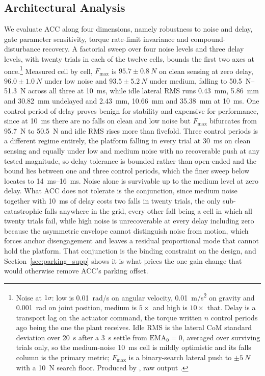 \documentclass[a4paper,fleqn]{cas-dc}
\begin{document}
\subsection{Architectural Analysis}
\label{sec:analysis}

We evaluate ACC along four dimensions, namely robustness to noise and delay, gate
parameter sensitivity, torque rate-limit invariance and compound-disturbance
recovery. A factorial sweep over four noise levels and three delay levels, with
twenty trials in each of the twelve cells, bounds the first two axes at
once.\footnote{Noise at $1\sigma$: low is \SI{0.01}{rad/s} on angular velocity,
\SI{0.01}{m/s^2} on gravity and \SI{0.001}{rad} on joint position, medium is
$5\times$ and high is $10\times$ that. Delay is a transport lag on the actuator
command, the torque written $n$ control periods ago being the one the plant
receives. Idle RMS is the lateral CoM standard deviation over \SI{20}{s} after a
\SI{3}{s} settle from $\mathrm{EMA}_0{=}0$, averaged over surviving trials only,
so the medium-noise \SI{10}{ms} cell is mildly optimistic and its falls column is
the primary metric; $F_{\max}$ is a binary-search lateral push to
$\pm\SI{5}{N}$ with a \SI{10}{N} search floor. Produced by
, raw output
.} Measured cell by cell,
$F_{\max}$ is $95.7{\pm}\SI{0.8}{N}$ on clean sensing at zero delay,
$96.0{\pm}\SI{1.0}{N}$ under low noise and $93.5{\pm}\SI{5.2}{N}$ under medium,
falling to \SIrange{50.5}{51.3}{N} across all three at \SI{10}{ms}, while idle
lateral RMS runs \SI{0.43}{mm}, \SI{5.86}{mm} and \SI{30.82}{mm} undelayed and
\SI{2.43}{mm}, \SI{10.66}{mm} and \SI{35.38}{mm} at \SI{10}{ms}. One
control period of delay proves benign for stability and expensive for
performance, since at \SI{10}{ms} there are no falls on clean and low noise but
$F_{\max}$ bifurcates from \SI{95.7}{N} to \SI{50.5}{N} and idle RMS rises more
than fivefold. Three control periods is a different regime entirely, the platform
falling in every trial at \SI{30}{ms} on clean sensing and equally under low and
medium noise with no recoverable push at any tested magnitude, so delay tolerance
is bounded rather than open-ended and the bound lies between one and three
control periods, which the finer sweep below locates to \SIrange{14}{16}{ms}.
Noise alone is survivable up to the medium level at zero delay. What ACC does not
tolerate is the conjunction, since medium noise together with \SI{10}{ms} of
delay costs two falls in twenty trials, the only sub-catastrophic falls anywhere
in the grid, every other fall being a cell in which all twenty trials fail, while
high noise is unrecoverable at every delay including zero because the asymmetric
envelope cannot distinguish noise from motion, which forces anchor disengagement
and leaves a residual proportional mode that cannot hold the platform. That
conjunction is the binding constraint on the design, and
Section~\ref{sec:parking_supp} shows it is what prices the one gain change that
would otherwise remove ACC's parking offset.
\end{document}

